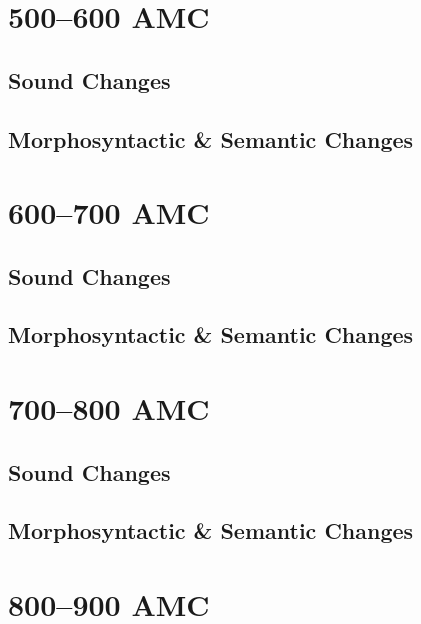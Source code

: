 \section{500--600 AMC}

\subsection{Sound Changes}


\subsection{Morphosyntactic \& Semantic Changes}


\section{600--700 AMC}

\subsection{Sound Changes}


\subsection{Morphosyntactic \& Semantic Changes}


\section{700--800 AMC}

\subsection{Sound Changes}


\subsection{Morphosyntactic \& Semantic Changes}


\section{800--900 AMC}

